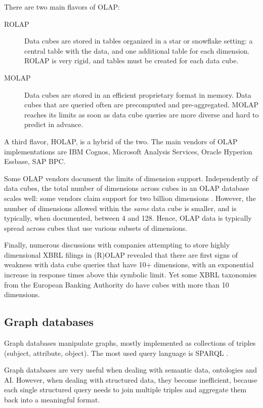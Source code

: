 \documentclass{acm_proc_article-sp}
\begin{document}
There are two main flavors of OLAP:
\vspace{-\topsep}
\begin{description}
\item[ROLAP] Data cubes are stored in tables organized in a star or snowflake setting: a central table with the data, and one additional table for each dimension. ROLAP is very rigid, and tables must be created for each data cube.
\item[MOLAP] Data cubes are stored in an efficient proprietary format in memory. Data cubes that are queried often are precomputed and pre-aggregated. MOLAP reaches its limits as soon as data cube queries are more diverse and hard to predict in advance.
\end{description}

A third flavor, HOLAP, is a hybrid of the two. The main vendors of OLAP implementations are IBM Cognos, Microsoft Analysis Services, Oracle Hyperion Essbase, SAP BPC.

Some OLAP vendors document the limits of dimension support. Independently of data cubes, the total number of dimensions across cubes in an OLAP database scales well: some vendors claim support for two billion dimensions \cite{AnalysisServicesLimit}. However, the number of dimensions allowed within the \emph{same} data cube is smaller, and is typically, when documented, between 4 and 128. Hence, OLAP data is typically spread across cubes that use various subsets of dimensions.

Finally, numerous discussions with companies attempting to store highly dimensional XBRL filings in (R)OLAP revealed that there are first signs of weakness with data cube queries that have 10+ dimensions, with an exponential increase in response times above this symbolic limit. Yet some XBRL taxonomies from the European Banking Authority \cite{DPM} do have cubes with more than 10 dimensions.

\subsection{Graph databases}

Graph databases manipulate graphs, mostly implemented as collections of triples (subject, attribute, object). The most used query language is SPARQL \cite{SPARQL}.

Graph databases are very useful when dealing with semantic data, ontologies and AI. However, when dealing with structured data, they become inefficient, because each single structured query needs to join multiple triples and aggregate them back into a meaningful format.
\end{document}
